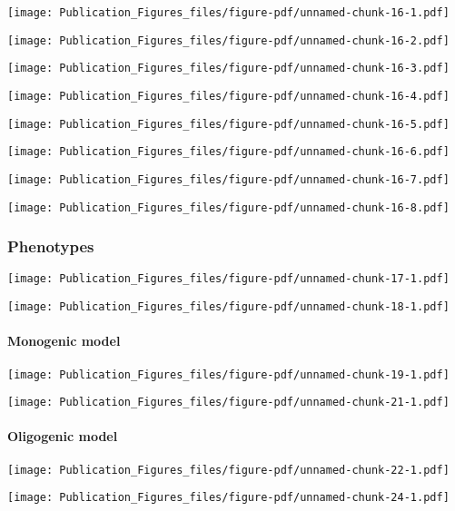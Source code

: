 \documentclass[
  letterpaper,
  DIV=11,
  numbers=noendperiod]{scrartcl}
\begin{document}
\texttt{[image: Publication\_Figures\_files/figure-pdf/unnamed-chunk-16-1.pdf]}

\texttt{[image: Publication\_Figures\_files/figure-pdf/unnamed-chunk-16-2.pdf]}

\texttt{[image: Publication\_Figures\_files/figure-pdf/unnamed-chunk-16-3.pdf]}

\texttt{[image: Publication\_Figures\_files/figure-pdf/unnamed-chunk-16-4.pdf]}

\texttt{[image: Publication\_Figures\_files/figure-pdf/unnamed-chunk-16-5.pdf]}

\texttt{[image: Publication\_Figures\_files/figure-pdf/unnamed-chunk-16-6.pdf]}

\texttt{[image: Publication\_Figures\_files/figure-pdf/unnamed-chunk-16-7.pdf]}

\texttt{[image: Publication\_Figures\_files/figure-pdf/unnamed-chunk-16-8.pdf]}

\hypertarget{phenotypes}{%
\subsubsection{Phenotypes}\label{phenotypes}}

\texttt{[image: Publication\_Figures\_files/figure-pdf/unnamed-chunk-17-1.pdf]}

\texttt{[image: Publication\_Figures\_files/figure-pdf/unnamed-chunk-18-1.pdf]}

\hypertarget{monogenic-model}{%
\paragraph{Monogenic model}\label{monogenic-model}}

\texttt{[image: Publication\_Figures\_files/figure-pdf/unnamed-chunk-19-1.pdf]}

\texttt{[image: Publication\_Figures\_files/figure-pdf/unnamed-chunk-21-1.pdf]}

\hypertarget{oligogenic-model}{%
\paragraph{Oligogenic model}\label{oligogenic-model}}

\texttt{[image: Publication\_Figures\_files/figure-pdf/unnamed-chunk-22-1.pdf]}

\texttt{[image: Publication\_Figures\_files/figure-pdf/unnamed-chunk-24-1.pdf]}

\hypertarget{section}{%
\subsection{}\label{section}}
\end{document}
